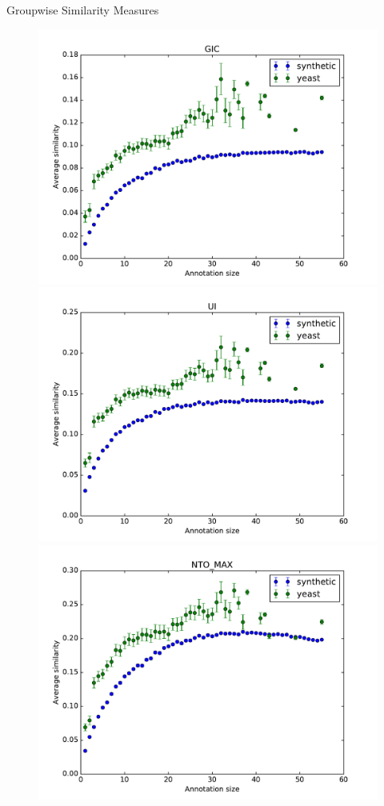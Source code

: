 \documentclass{beamer}
\begin{document}
\begin{frame}{Groupwise Similarity Measures}

\begin{figure}
\includegraphics[width=0.5\linewidth, height=0.4\textheight]{groupwise/SIM_GROUPWISE_DAG_GIC_avg.pdf}
\includegraphics[width=0.5\linewidth, height=0.4\textheight]{groupwise/SIM_GROUPWISE_DAG_UI_avg.pdf} \\
\includegraphics[width=0.5\linewidth, height=0.4\textheight]{groupwise/SIM_GROUPWISE_DAG_NTO_MAX_avg.pdf}
\end{figure}

\end{frame}
\end{document}
